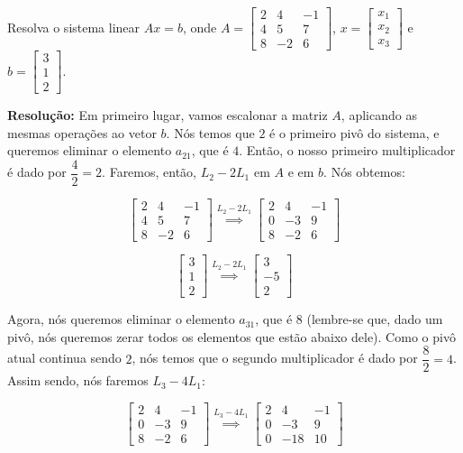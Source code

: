 \begin{Example}
	Resolva o sistema linear $Ax = b$, onde $A = \begin{bmatrix}
		2 & 4 & -1 \\
		4 & 5 & 7 \\
		8 & -2 & 6
	\end{bmatrix}$, $x = \begin{bmatrix}
		x_1 \\
		x_2 \\
		x_3
	\end{bmatrix}$ e $b = \begin{bmatrix}
		3 \\
		1 \\
		2
	\end{bmatrix}$.
	
	\textbf{Resolução:} Em primeiro lugar, vamos escalonar a matriz $A$, aplicando as mesmas operações ao vetor $b$. Nós temos que $2$ é o primeiro pivô do sistema, e queremos eliminar o elemento $a_{21}$, que é $4$. Então, o nosso primeiro multiplicador é dado por $\dfrac{4}{2} = 2$. Faremos, então, $L_2 - 2L_1$ em $A$ e em $b$. Nós obtemos:
	
	$$
	\begin{bmatrix}
		2 & 4 & -1 \\
		4 & 5 & 7 \\
		8 & -2 & 6
	\end{bmatrix} \overset{L_2 - 2L_1}{\implies} \begin{bmatrix}
		2 & 4 & -1 \\
		0 & -3 & 9 \\
		8 & -2 & 6
	\end{bmatrix}
	$$
	
	$$
	\begin{bmatrix}
		3 \\
		1 \\
		2
	\end{bmatrix} \overset{L_2 - 2L_1}{\implies} \begin{bmatrix}
		3 \\
		-5 \\
		2
	\end{bmatrix}
	$$
	
	Agora, nós queremos eliminar o elemento $a_{31}$, que é $8$ (lembre-se que, dado um pivô, nós queremos zerar todos os elementos que estão abaixo dele). Como o pivô atual continua sendo $2$, nós temos que o segundo multiplicador é dado por $\dfrac{8}{2} = 4$. Assim sendo, nós faremos $L_3 - 4L_1$:
	
	$$
	\begin{bmatrix}
		2 & 4 & -1 \\
		0 & -3 & 9 \\
		8 & -2 & 6
	\end{bmatrix} \overset{L_3 - 4L_1}{\implies} \begin{bmatrix}
		2 & 4 & -1 \\
		0 & -3 & 9 \\
		0 & -18 & 10
	\end{bmatrix}
	$$
	

\end{Example}
